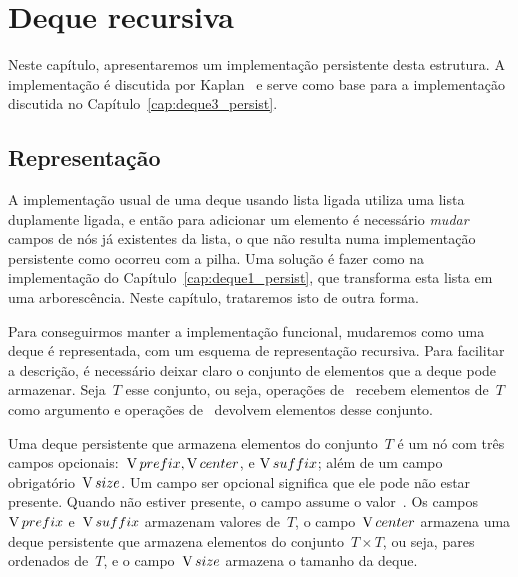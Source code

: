 \documentclass[main.tex]{subfiles}
\begin{document}
\chapter{Deque recursiva} \label{cap:deque2_persist}

Neste capítulo, apresentaremos um implementação persistente desta estrutura. A implementação é discutida por Kaplan~\cite{Kaplan2001} e serve como base para a implementação discutida no Capítulo~\ref{cap:deque3_persist}.


\section{Representação}

A implementação usual de uma deque usando lista ligada utiliza uma lista duplamente ligada, e então para adicionar um elemento é necessário \emph{mudar} campos de nós já existentes da lista, o que não resulta numa implementação persistente como ocorreu com a pilha. Uma solução é fazer como na implementação do Capítulo~\ref{cap:deque1_persist}, que transforma esta lista em uma arborescência. Neste capítulo, trataremos isto de outra forma.

Para conseguirmos manter a implementação funcional, mudaremos como uma deque é representada, com um esquema de representação recursiva. Para facilitar a descrição, é necessário deixar claro o conjunto de elementos que a deque pode armazenar. Seja~$T$ esse conjunto, ou seja, operações de~ recebem elementos de~$T$ como argumento e operações de~ devolvem elementos desse conjunto.

Uma deque persistente que armazena elementos do conjunto~$T$ é um nó com três campos opcionais:~$\operatorname{V}{prefix}, \operatorname{V}{center}$, e $\operatorname{V}{suffix}$; além de um campo obrigatório~$\operatorname{V}{size}$. Um campo ser opcional significa que ele pode não estar presente. Quando não estiver presente, o campo assume o valor~. Os campos~$\operatorname{V}{prefix}$ e~$\operatorname{V}{suffix}$ armazenam valores de~$T$, o campo~$\operatorname{V}{center}$ armazena uma deque persistente que armazena elementos do conjunto~$T \times T$, ou seja, pares ordenados de~$T$, e o campo~$\operatorname{V}{size}$ armazena o tamanho da deque.
\end{document}
